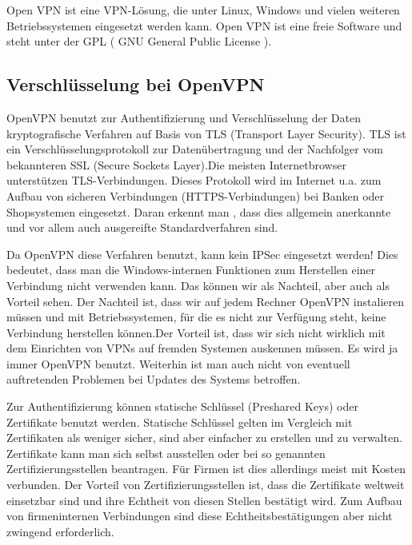 \documentclass[12pt]{scrartcl}
\begin{document}

Open VPN ist eine VPN-Lösung, die unter Linux, Windows und vielen weiteren Betriebssystemen eingesetzt werden kann.
Open VPN ist eine freie Software und steht unter der GPL ( GNU General Public License ).

\subsection{Verschlüsselung bei OpenVPN}

OpenVPN benutzt zur Authentifizierung und Verschlüsselung der Daten kryptografische Verfahren auf Basis von TLS (Transport Layer Security). TLS ist ein Verschlüsselungsprotokoll zur Datenübertragung und der Nachfolger vom bekannteren SSL (Secure Sockets Layer).Die meisten Internetbrowser unterstützen TLS-Verbindungen. Dieses Protokoll wird im Internet u.a. zum Aufbau von sicheren Verbindungen  (HTTPS-Verbindungen) bei Banken oder Shopsystemen  eingesetzt. Daran erkennt man , dass dies allgemein anerkannte und vor allem auch ausgereifte  Standardverfahren sind.

Da OpenVPN diese Verfahren benutzt, kann kein IPSec eingesetzt werden! Dies bedeutet, dass man die Windows-internen Funktionen zum Herstellen einer Verbindung nicht verwenden kann. Das können wir als Nachteil, aber auch als Vorteil sehen. Der Nachteil ist, dass wir auf jedem Rechner OpenVPN instalieren müssen und mit Betriebssystemen, für die es nicht zur Verfügung steht, keine Verbindung herstellen können.Der Vorteil ist, dass wir sich nicht wirklich mit dem Einrichten von VPNs auf fremden Systemen auskennen müssen. Es wird ja immer OpenVPN benutzt. Weiterhin ist man auch nicht von eventuell auftretenden Problemen bei Updates des Systems betroffen.

Zur Authentifizierung können statische Schlüssel (Preshared Keys) oder Zertifikate benutzt werden. Statische Schlüssel gelten im Vergleich mit Zertifikaten  als weniger sicher, sind aber einfacher zu erstellen und zu verwalten. Zertifikate kann man sich selbst ausstellen oder bei so genannten Zertifizierungsstellen beantragen. Für Firmen ist dies allerdings meist mit Kosten verbunden. Der Vorteil von Zertifizierungsstellen ist, dass die Zertifikate weltweit einsetzbar sind und ihre Echtheit von diesen Stellen bestätigt wird. Zum Aufbau von firmeninternen Verbindungen sind diese Echtheitsbestätigungen aber nicht zwingend erforderlich.
\end{document}
